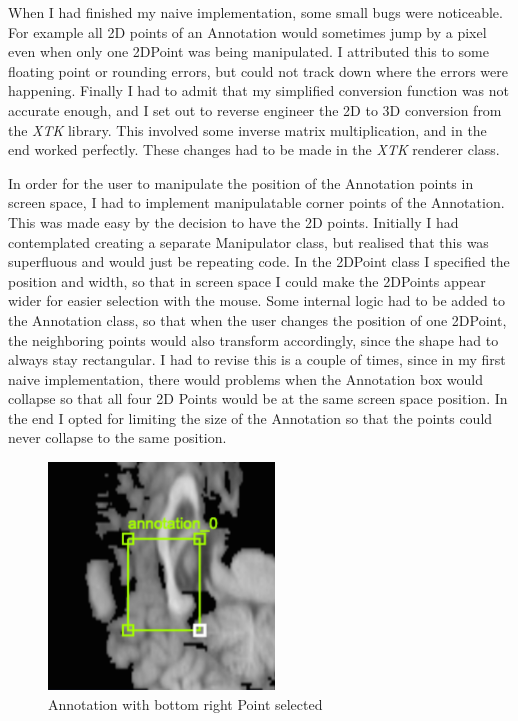 \documentclass[a4paper,11pt,twoside]{article}
\begin{document}
When I had finished my naive implementation, some small bugs were noticeable. For example all 2D points of an Annotation would sometimes jump by a pixel even when only one 2DPoint was being manipulated. I attributed this to some floating point or rounding errors, but could not track down where the errors were happening. Finally I had to admit that my simplified conversion function was not accurate enough, and I set out to reverse engineer the 2D to 3D conversion from the \textit{XTK} library. This involved some inverse matrix multiplication, and in the end worked perfectly. These changes had to be made in the \textit{XTK} renderer class.

In order for the user to manipulate the position of the Annotation points in screen space, I had to implement manipulatable corner points of the Annotation. This was made easy by the decision to have the 2D points. Initially I had contemplated creating a separate Manipulator class, but realised that this was superfluous and would just be repeating code. In the 2DPoint class I specified the position and width, so that in screen space I could make the 2DPoints appear wider for easier selection with the mouse. Some internal logic had to be added to the Annotation class, so that when the user changes the position of one 2DPoint, the neighboring points would also transform accordingly, since the shape had to always stay rectangular. I had to revise this is a couple of times, since in my first naive implementation, there would problems when the Annotation box would collapse so that all four 2D Points would be at the same screen space position. In the end I opted for limiting the size of the Annotation so that the points could never collapse to the same position.

\begin{figure}[ht!]
\centering
\includegraphics[width=60mm]{graphics/annoSelected_01.png}
\caption{Annotation with bottom right Point selected }
\label{fig:UIdesign1}
\end{figure}
\end{document}
